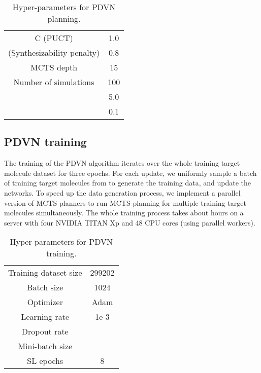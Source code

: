\documentclass[nohyperref]{article}
\theoremstyle{plain}
\theoremstyle{definition}
\theoremstyle{remark}
\begin{document}
\begin{table}[h]
\centering
\caption{Hyper-parameters for PDVN planning.}
\label{tab:hyper}
\begin{tabular}{cc}
\toprule
C (PUCT) & 1.0 \\
 (Synthesizability penalty) & 0.8 \\
MCTS depth & 15 \\
Number of simulations & 100 \\
 & 5.0 \\
 & 0.1 \\
\bottomrule
\end{tabular}
\end{table}

\subsection{PDVN training}

The training of the PDVN algorithm iterates over the whole training target molecule dataset  for three epochs. For each update, we uniformly sample a batch of training target molecules from  to generate the training data, and update the networks. To speed up the data generation process, we implement a parallel version of MCTS planners to run MCTS planning for multiple training target molecules simultaneously. 
The whole training process takes about  hours on a server with four NVIDIA TITAN Xp and 48 CPU cores
(using  parallel workers).

\begin{table}[h]
\centering
\caption{Hyper-parameters for PDVN training.}
\label{tab:hyper}
\begin{tabular}{cc}
\toprule
Training dataset size & 299202 \\
Batch size & 1024 \\
Optimizer & Adam \\
Learning rate & 1e-3 \\
Dropout rate &  \\
Mini-batch size &  \\
SL epochs & 8 \\
\bottomrule
\end{tabular}
\vskip-0.11in
\end{table}
\end{document}
